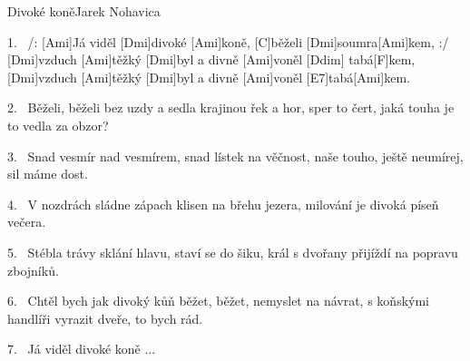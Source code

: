 \begin{song}{Divoké koně}{Jarek Nohavica}

\begin{xverse}{1.~}
/: [Ami]Já viděl [Dmi]divoké [Ami]koně, [C]běželi [Dmi]soumra[Ami]kem, :/
[Dmi]vzduch [Ami]těžký [Dmi]byl a divně [Ami]voněl [Ddim]{\,\,}tabá[F]kem,
[Dmi]vzduch [Ami]těžký [Dmi]byl a divně [Ami]voněl [E7]tabá[Ami]kem.
\end{xverse}

\begin{xverse}{2.~}
Běželi, běželi bez uzdy a sedla krajinou řek a hor,
sper to čert, jaká touha je to vedla za obzor?
\end{xverse}

\begin{xverse}{3.~}
Snad vesmír nad vesmírem, snad lístek na věčnost,
naše touho, ještě neumírej, sil máme dost.
\end{xverse}

\begin{xverse}{4.~}
V nozdrách sládne zápach klisen na břehu jezera,
milování je divoká píseň večera.
\end{xverse}

\begin{xverse}{5.~}
Stébla trávy sklání hlavu, staví se do šiku,
král s dvořany přijíždí na popravu zbojníků.
\end{xverse}

\begin{xverse}{6.~}
Chtěl bych jak divoký kůň běžet, běžet, nemyslet na návrat,
s koňskými handlíři vyrazit dveře, to bych rád.
\end{xverse}

\begin{xverse}{7.~}
Já viděl divoké koně ...
\end{xverse}

\end{song}
\chords{\chordAdim}

